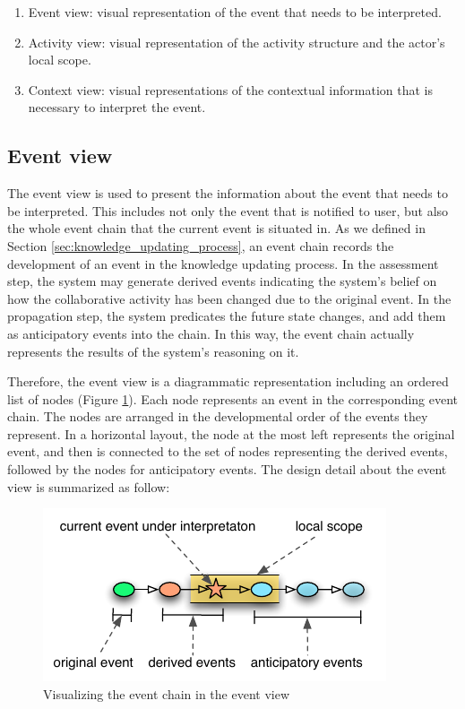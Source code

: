\begin{enumerate}
	\item Event view: visual representation of the event that needs to be interpreted.
	\item Activity view: visual representation of the activity structure and the actor's local scope.
	\item Context view: visual representations of the contextual information that is necessary to interpret the event.
\end{enumerate}

\subsection{Event view} %
\label{sub:event_view}
The event view is used to present the information about the event that needs to be interpreted. This includes not only the event that is notified to user, but also the whole event chain that the current event is situated in. As we defined in Section \ref{sec:knowledge_updating_process}, an event chain records the development of an event in the knowledge updating process. In the assessment step, the system may generate derived events indicating the system's belief on how the collaborative activity has been changed due to the original event. In the propagation step, the system predicates the future state changes, and add them as anticipatory events into the chain. In this way, the event chain actually represents the results of the system's reasoning on it. 

Therefore, the event view is a diagrammatic representation including an ordered list of nodes (Figure \ref{fig:event_chain}). Each node represents an event in the corresponding event chain. The nodes are arranged in the developmental order of the events they represent. In a horizontal layout, the node at the most left represents the original event, and then is connected to the set of nodes representing the derived events, followed by the nodes for anticipatory events. The design detail about the event view is summarized as follow:

\begin{figure}[htbp] %
	\centering
	\includegraphics{event_chain.pdf} 
	\caption{Visualizing the event chain in the event view}
	\label{fig:event_chain}
\end{figure}

